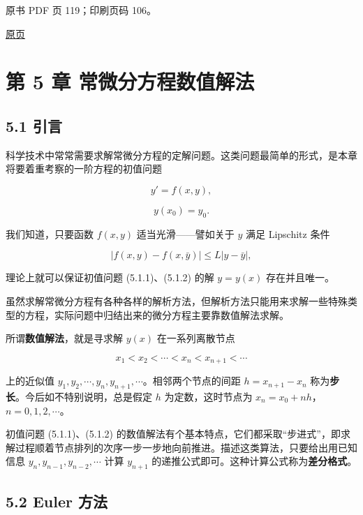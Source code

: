 \clearpage

原书 PDF 页 119；印刷页码 106。

\href{source-images/pdf-119.jpeg}{原页}

\section{第 5 章 常微分方程数值解法}\label{ch05a-ux7b2c-5-ux7ae0-ux5e38ux5faeux5206ux65b9ux7a0bux6570ux503cux89e3ux6cd5}

\subsection{5.1 引言}\label{ch05a-ux5f15ux8a00}

科学技术中常常需要求解常微分方程的定解问题。这类问题最简单的形式，是本章将要着重考察的一阶方程的初值问题

\[
y'=f(x,y),\tag{5.1.1}
\]

\[
y(x_0)=y_0.\tag{5.1.2}
\]

我们知道，只要函数 \(f(x,y)\) 适当光滑------譬如关于 \(y\) 满足 Lipschitz 条件

\[
|f(x,y)-f(x,\bar y)|\leqslant L|y-\bar y|,
\]

理论上就可以保证初值问题 (5.1.1)、(5.1.2) 的解 \(y=y(x)\) 存在并且唯一。

虽然求解常微分方程有各种各样的解析方法，但解析方法只能用来求解一些特殊类型的方程，实际问题中归结出来的微分方程主要靠数值解法求解。

所谓\textbf{数值解法}，就是寻求解 \(y(x)\) 在一系列离散节点

\[
x_1<x_2<\cdots<x_n<x_{n+1}<\cdots
\]

上的近似值 \(y_1,\allowbreak y_2,\allowbreak \cdots,\allowbreak y_n,\allowbreak y_{n+1},\allowbreak \cdots\)。相邻两个节点的间距 \(h=x_{n+1}-x_n\) 称为\textbf{步长}。今后如不特别说明，总是假定 \(h\) 为定数，这时节点为 \(x_n=x_0+nh\)，\(n=0,1,2,\cdots\)。

初值问题 (5.1.1)、(5.1.2) 的数值解法有个基本特点，它们都采取``步进式''，即求解过程顺着节点排列的次序一步一步地向前推进。描述这类算法，只要给出用已知信息 \(y_n,y_{n-1},y_{n-2},\cdots\) 计算 \(y_{n+1}\) 的递推公式即可。这种计算公式称为\textbf{差分格式}。

\subsection{5.2 Euler 方法}\label{ch05a-euler-ux65b9ux6cd5}

